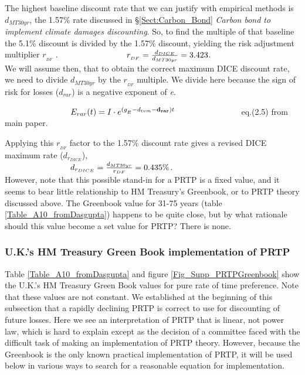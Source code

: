 \documentclass{article}
\begin{document}
The highest baseline discount rate that we can justify with empirical methods is $d_{M{T30yr}}$, the 1.57\% rate discussed in \S \ref{Sect:Carbon_Bond} \emph{Carbon bond to implement climate damages discounting}. So, to find the multiple of that baseline the 5.1\% discount is divided by the 1.57\% discount, yielding the risk adjustment multiplier $r_{_{DF}}$ .
$\\ \hbox{} \qquad \qquad \qquad \qquad r_{_{DF}}={\frac{d_{DICE}}{d_{M{T30yr}}}} = 3.423 $. \\ 

We will assume then, that to obtain the correct maximum DICE discount rate, we need to divide $d_{M{T30yr}}$ by the $r_{_{DF}}$ multiple. We divide here because the sign of risk for losses ($d_{rar}$) is a negative exponent of \emph{e}. 

$ \hbox{} \qquad \qquad \qquad \qquad 
E_{rar}(t) = I \cdot e^{(g_{_E} - d_{tvm} - \mathbf{d_{rar}} )t}  \qquad \qquad \qquad \qquad $eq.(2.5) from main paper.


Applying this $r_{_{DF}}$ factor to the 1.57\% discount rate gives a revised DICE maximum rate ($d_{r_{DICE}}$), \\
$\hbox{} \qquad \qquad \qquad \qquad d_{r_{DICE}}= \frac{d_{M{T30yr}}}{r_{DF}} = 0.435\%$. \\ 
However, note that this possible stand-in for a PRTP is a fixed value, and it seems to bear little relationship to HM Treasury's Greenbook, or to PRTP theory discussed above. The Greenbook value for 31-75 years (table \ref{Table_A10_fromDasgupta}) happens to be quite close, but by what rationale should this value become a set value for PRTP? There is none. 

\subsubsection{U.K.'s HM Treasury Green Book implementation of PRTP}
Table \ref{Table_A10_fromDasgupta} and figure \ref{Fig_Supp_PRTPGreenbook} show the U.K.'s HM Treasury Green Book values for pure rate of time preference. Note that these values are not constant. We established at the beginning of this subsection that a rapidly declining PRTP is correct to use for discounting of future losses. Here we see an interpretation of PRTP that is linear, not power law, which is hard to explain except as the decision of a committee faced with the difficult task of making an implementation of PRTP theory. However, because the Greenbook is the only known practical implementation of PRTP, it will be used below in various ways to search for a reasonable equation for implementation.  
\end{document}
